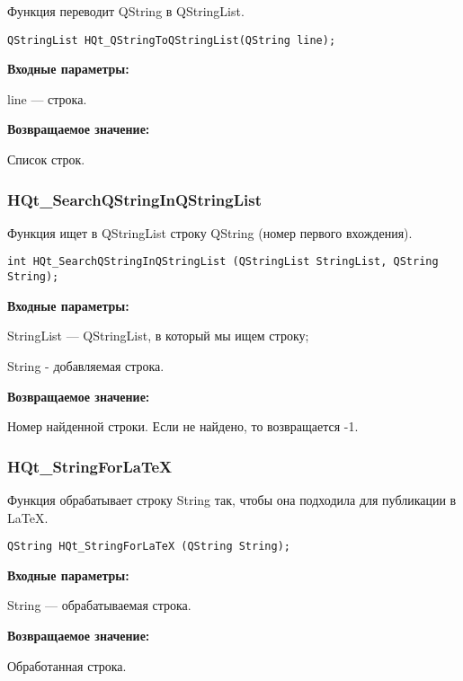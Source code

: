 \documentclass[a4paper,12pt]{article}
\begin{document}
Функция переводит QString в QStringList.


\begin{lstlisting}[label=code_syntax_HQt_QStringToQStringList,caption=Синтаксис]
QStringList HQt_QStringToQStringList(QString line);
\end{lstlisting}

\textbf{Входные параметры:}
 
line --- строка.

\textbf{Возвращаемое значение:}

Список строк.


\subsubsection{HQt\_SearchQStringInQStringList}\label{HQt_SearchQStringInQStringList}

Функция ищет в QStringList строку QString (номер первого вхождения).


\begin{lstlisting}[label=code_syntax_HQt_SearchQStringInQStringList,caption=Синтаксис]
int HQt_SearchQStringInQStringList (QStringList StringList, QString String);
\end{lstlisting}

\textbf{Входные параметры:}
 
StringList --- QStringList, в который мы ищем строку;

String - добавляемая строка.

\textbf{Возвращаемое значение:}

Номер найденной строки. Если не найдено, то возвращается -1.


\subsubsection{HQt\_StringForLaTeX}\label{HQt_StringForLaTeX}

Функция обрабатывает строку String так, чтобы она подходила для публикации в LaTeX.


\begin{lstlisting}[label=code_syntax_HQt_StringForLaTeX,caption=Синтаксис]
QString HQt_StringForLaTeX (QString String);
\end{lstlisting}

\textbf{Входные параметры:}

String --- обрабатываемая строка.

\textbf{Возвращаемое значение:}
 
Обработанная строка.
\end{document}
